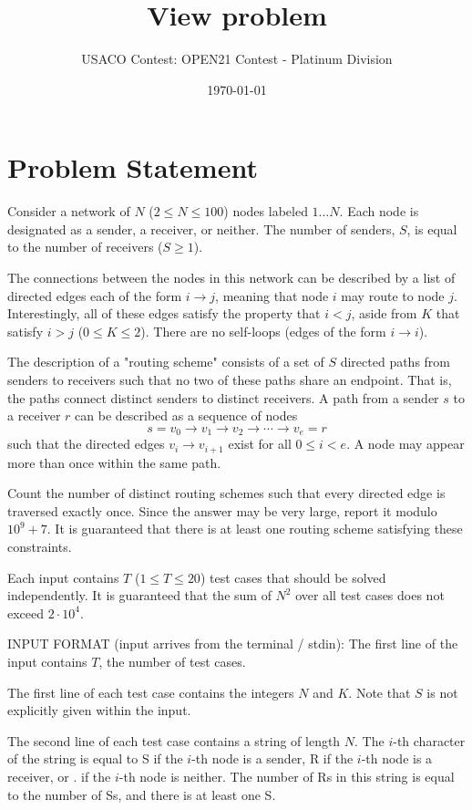 \documentclass[12pt]{article}
\title{View problem}
\author{USACO Contest: OPEN21 Contest - Platinum Division}
\date{\today}
\begin{document}
\maketitle

\section*{Problem Statement}

Consider a network of $N$ ($2\le N\le 100$) nodes labeled $1\ldots N$. Each node
is designated as a sender, a receiver, or neither. The number of senders, $S$,
is equal to the number of receivers ($S\ge 1$). 

The connections between the nodes in this network can be described by a list of
directed edges each of the form $i\to j$, meaning that node $i$ may route to
node $j$. Interestingly, all of these edges satisfy the property that $i<j$,
aside from $K$ that satisfy $i>j$ ($0\le K\le 2$). There are no self-loops
(edges of the form $i\to i$).

The description of a "routing scheme" consists of a set of $S$ directed paths
from senders to receivers such that no two of these paths share an endpoint.
That is, the paths connect distinct senders to distinct receivers. A path from a
sender $s$ to a receiver $r$ can be described as a sequence of nodes
$$s=v_0\to v_1 \to v_2\to \cdots \to v_e=r$$
such that the directed edges $v_i\to v_{i+1}$ exist for all $0\le i<e$. A node
may appear more than once within the same path.

Count the number of distinct routing schemes such that every directed edge is
traversed exactly once. Since the answer may be very large, report it modulo
$10^9+7$. It is guaranteed that there is at least
one routing scheme satisfying these constraints.

Each input contains $T$ ($1\le T\le 20$) test cases that should be solved
independently. It is guaranteed that the sum of $N^2$ over all test cases does
not exceed $2\cdot 10^4$.

INPUT FORMAT (input arrives from the terminal / stdin):
The first line of the input contains $T$, the number of test cases.

The first line of each test case contains the integers $N$ and $K$. Note that
$S$  is not explicitly given within the input.

The second line of each test case contains a string of length $N$. The $i$-th
character of the string  is equal to S if the $i$-th node is a sender, R if the
$i$-th node is a receiver, or . if the $i$-th node is neither. The number of Rs
in this string is equal to the number of Ss, and there is at least one S.
\end{document}
